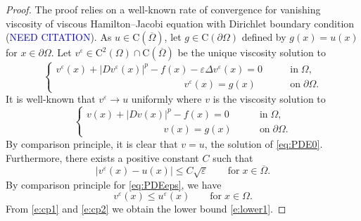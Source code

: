 \documentclass[11pt,reqno]{amsart}
\numberwithin{figure}{section}
\theoremstyle{plain}
\theoremstyle{remark}
\numberwithin{equation}{section}
\begin{document}
\begin{proof} The proof relies on a well-known rate of convergence for vanishing viscosity of viscous Hamilton--Jacobi equation with Dirichlet boundary condition (\textcolor{blue}{NEED CITATION}). As $u\in \mathrm{C}(\overline{\Omega})$, let $g\in \mathrm{C}(\partial\Omega)$ defined by $g(x) = u(x)$ for $x\in \partial\Omega$. Let $v^\varepsilon\in \mathrm{C}^2(\Omega)\cap \mathrm{C}(\overline{\Omega})$ be the unique viscosity solution to
\begin{equation*}
    \begin{cases}
          v^\varepsilon(x) + |Dv^\varepsilon(x)|^p - f(x) - \varepsilon \Delta v^\varepsilon(x) = 0 &\qquad\text{in}\;\Omega,\\
        \qquad\qquad\qquad\qquad\qquad \qquad\quad v^\varepsilon(x) = g(x) &\qquad\text{on}\;\partial\Omega.
    \end{cases}
\end{equation*}
It is well-known that $v^\varepsilon \to u$ uniformly where $v$ is the viscosity solution to
\begin{equation*}
\begin{cases}
       v(x) + |Dv(x)|^p - f(x) = 0 &\qquad\text{in}\;\Omega,\\
     \qquad\qquad\qquad\quad\;\;\; v(x) = g(x)&\qquad\text{on}\;\partial\Omega. 
\end{cases}
\end{equation*}
By comparison principle, it is clear that $v = u$, the solution of \eqref{eq:PDE0}. Furthermore, there exists a positive constant $C$ such that 
\begin{equation}\label{e:cp1}
     |v^\varepsilon(x)  - u(x)| \leq C\sqrt{\varepsilon} \qquad\text{for}\;x\in \overline{\Omega}.
\end{equation}
By comparison principle for \eqref{eq:PDEeps}, we have
\begin{equation}\label{e:cp2}
    v^\varepsilon(x)\leq u^\varepsilon(x) \qquad\text{for}\;x\in \Omega.
\end{equation}
From \eqref{e:cp1} and \eqref{e:cp2} we obtain the lower bound \eqref{e:lower1}.
\end{proof}

\end{document}
